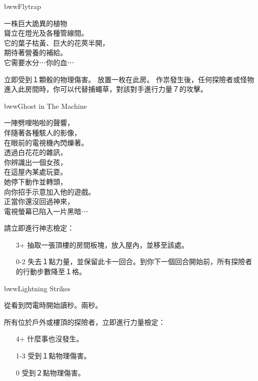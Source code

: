 \linebreak[0]%
\begin{EventCard}{bww}{Flytrap}
  \begin{CardStory}
    一株巨大詭異的植物\\
    聳立在燈光及各種管線間。\\
    它的葉子枯黃、巨大的花莢半開，\\
    期待著營養的補給。\\
    它需要水分⋯你的血⋯
  \end{CardStory}
  立即受到１顆骰的物理傷害。\smallbreak
  放置一枚在此房。\smallbreak
  作祟發生後，任何探險者或怪物進入此房間時，你可以代替捕蠅草，對該對手進行力量７的攻擊。\smallbreak
\end{EventCard}%
\linebreak[0]%
\begin{EventCard}{bww}{Ghost in The Machine}
  \begin{CardStory}
    一陣劈哩啪啦的聲響，\\
    伴隨著各種駭人的影像，\\
    在眼前的電視機內閃爍著。\\
    透過白花花的雜訊，\\
    你辨識出一個女孩，\\
    在這屋內某處玩耍。\\
    她停下動作並轉頭，\\
    向你招手示意加入他的遊戲。\\
    正當你還沒回過神來，\\
    電視螢幕已陷入一片黑暗⋯
  \end{CardStory}
  請立即進行神志檢定：
  \begin{itemize}
    \item[3+] 抽取一張頂樓的房間板塊，放入屋內，並移至該處。
    \item[0-2] 失去１點力量，並保留此卡一回合。到你下一個回合開始前，所有探險者的行動步數降至１格。
  \end{itemize}
\end{EventCard}%
\linebreak[0]%
\begin{EventCard}{bww}{Lightning Strikes}
  \begin{CardStory}
    從看到閃電時開始讀秒。兩秒。
  \end{CardStory}
  所有位於戶外或樓頂的探險者，立即進行力量檢定：
  \begin{itemize}
    \item[4+] 什麼事也沒發生。
    \item[1-3] 受到１點物理傷害。
    \item[0] 受到２點物理傷害。
  \end{itemize}
\end{EventCard}%
